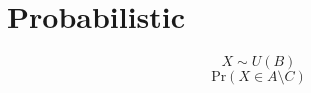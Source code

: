 \documentclass{article}
\begin{document}
\section{Probabilistic}

$$X \sim U(B)$$
$$\text{Pr}(X \in A \setminus C)$$
\end{document}
